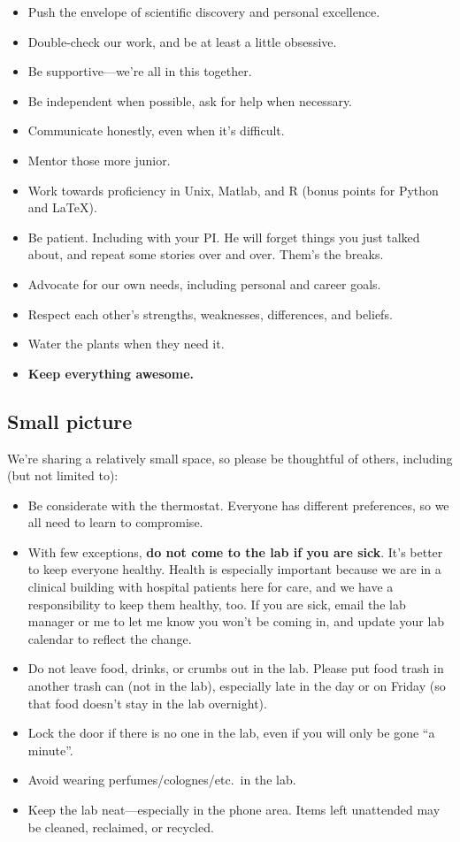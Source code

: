\documentclass[letterpaper,12pt,oneside]{memoir}
\begin{document}
\begin{itemize}
\item Push the envelope of scientific discovery and personal excellence. 
\item Double-check our work, and be at least a little obsessive.
\item Be supportive---we're all in this together.
\item Be independent when possible, ask for help when necessary.
\item Communicate honestly, even when it's difficult.
\item Mentor those more junior.
\item Work towards proficiency in Unix, Matlab, and R (bonus points for Python and LaTeX).
\item Be patient. Including with your PI. He will forget things you just talked about, and repeat some stories over and over. Them's the breaks.
\item Advocate for our own needs, including personal and career goals.
\item Respect each other's strengths, weaknesses, differences, and beliefs.
\item Water the plants when they need it.
\item \textbf{Keep everything awesome.}
\end{itemize}

\subsection{Small picture}

We're sharing a relatively small space, so please be thoughtful of others, including (but not limited to):

\begin{itemize}
\item Be considerate with the thermostat. Everyone has different preferences, so we all need to learn to compromise.
\item With few exceptions, \textbf{do not come to the lab if you are sick}. It's better to keep everyone healthy. Health is especially important because we are in a clinical building with hospital patients here for care, and we have a responsibility to keep them healthy, too. If you are sick, email the lab manager or me to let me know you won't be coming in, and update your lab calendar to reflect the change.
\item Do not leave food, drinks, or crumbs out in the lab. Please put food trash in another trash can (not in the lab), especially late in the day or on Friday (so that food doesn't stay in the lab overnight).
\item Lock the door if there is no one in the lab, even if you will only be gone ``a minute''.
\item Avoid wearing perfumes/colognes/etc.\ in the lab.
\item Keep the lab neat---especially in the phone area. Items left unattended may be cleaned, reclaimed, or recycled.
\end{itemize}
\end{document}

